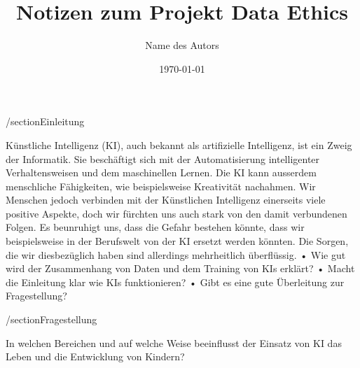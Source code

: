 \documentclass{article}
\title{Notizen zum Projekt Data Ethics}
\author{Name des Autors}
\date{\today}
\begin{document}
\maketitle


\tableofcontents

/section{Einleitung}

Künstliche Intelligenz (KI), auch bekannt als artifizielle Intelligenz, ist ein Zweig der Informatik. Sie beschäftigt sich mit der Automatisierung intelligenter Verhaltensweisen und dem maschinellen Lernen. Die KI kann ausserdem menschliche Fähigkeiten, wie beispielsweise Kreativität nachahmen. 
Wir Menschen jedoch verbinden mit der Künstlichen Intelligenz einerseits viele positive Aspekte, doch wir fürchten uns auch stark von den damit verbundenen Folgen. Es beunruhigt uns, dass die Gefahr bestehen könnte, dass wir beispielsweise in der Berufswelt von der KI ersetzt werden könnten. Die Sorgen, die wir diesbezüglich haben sind allerdings mehrheitlich überflüssig. 
• Wie gut wird der Zusammenhang von Daten und dem Training von KIs erklärt?
• Macht die Einleitung klar wie KIs funktionieren?
• Gibt es eine gute Überleitung zur Fragestellung?

/section{Fragestellung}

In welchen Bereichen und auf welche Weise beeinflusst der Einsatz von KI das Leben und die Entwicklung von Kindern?





\printbibliography
\end{document}
